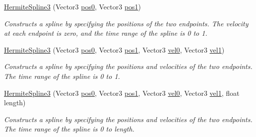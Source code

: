 \begin{DoxyCompactItemize}
\item 
\mbox{\hyperlink{struct_leap_1_1_unity_1_1_animation_1_1_hermite_spline3_a77e7a488f4b70ba103d08bb47e223d25}{Hermite\+Spline3}} (Vector3 \mbox{\hyperlink{struct_leap_1_1_unity_1_1_animation_1_1_hermite_spline3_ab9901f2a45abfb1155ce0df806e6530a}{pos0}}, Vector3 \mbox{\hyperlink{struct_leap_1_1_unity_1_1_animation_1_1_hermite_spline3_a249eaf51c265148a63ef2b0d395bc9c2}{pos1}})
\begin{DoxyCompactList}\small\item\em Constructs a spline by specifying the positions of the two endpoints. The velocity at each endpoint is zero, and the time range of the spline is 0 to 1. \end{DoxyCompactList}\item 
\mbox{\hyperlink{struct_leap_1_1_unity_1_1_animation_1_1_hermite_spline3_a3e0965b1cb3706781e3c0a77d02bdf30}{Hermite\+Spline3}} (Vector3 \mbox{\hyperlink{struct_leap_1_1_unity_1_1_animation_1_1_hermite_spline3_ab9901f2a45abfb1155ce0df806e6530a}{pos0}}, Vector3 \mbox{\hyperlink{struct_leap_1_1_unity_1_1_animation_1_1_hermite_spline3_a249eaf51c265148a63ef2b0d395bc9c2}{pos1}}, Vector3 \mbox{\hyperlink{struct_leap_1_1_unity_1_1_animation_1_1_hermite_spline3_a128d6140e17943ca3f1012404a8eaece}{vel0}}, Vector3 \mbox{\hyperlink{struct_leap_1_1_unity_1_1_animation_1_1_hermite_spline3_ab77b29135690ffc6f3671418100be381}{vel1}})
\begin{DoxyCompactList}\small\item\em Constructs a spline by specifying the positions and velocities of the two endpoints. The time range of the spline is 0 to 1. \end{DoxyCompactList}\item 
\mbox{\hyperlink{struct_leap_1_1_unity_1_1_animation_1_1_hermite_spline3_a8f97bb168dab46f340fd39d2f119582f}{Hermite\+Spline3}} (Vector3 \mbox{\hyperlink{struct_leap_1_1_unity_1_1_animation_1_1_hermite_spline3_ab9901f2a45abfb1155ce0df806e6530a}{pos0}}, Vector3 \mbox{\hyperlink{struct_leap_1_1_unity_1_1_animation_1_1_hermite_spline3_a249eaf51c265148a63ef2b0d395bc9c2}{pos1}}, Vector3 \mbox{\hyperlink{struct_leap_1_1_unity_1_1_animation_1_1_hermite_spline3_a128d6140e17943ca3f1012404a8eaece}{vel0}}, Vector3 \mbox{\hyperlink{struct_leap_1_1_unity_1_1_animation_1_1_hermite_spline3_ab77b29135690ffc6f3671418100be381}{vel1}}, float length)
\begin{DoxyCompactList}\small\item\em Constructs a spline by specifying the positions and velocities of the two endpoints. The time range of the spline is 0 to length. \end{DoxyCompactList}\item 

\end{DoxyCompactItemize}
